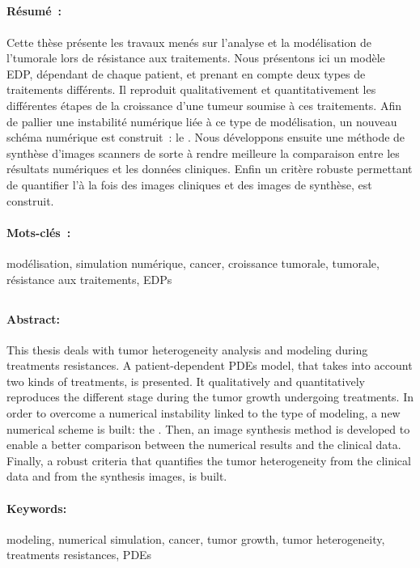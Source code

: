 \documentclass[main.tex]{subfiles}
\begin{document}
\subsection*{\titrefr}
\vfill
\paragraph{Résumé~:} Cette thèse présente les travaux menés sur l'analyse et la modélisation de l'\hetero tumorale lors de résistance aux traitements. 
Nous présentons ici un modèle EDP, dépendant de chaque patient, et prenant en compte deux types de traitements différents. Il reproduit qualitativement et quantitativement les différentes étapes de la croissance d'une tumeur soumise à ces traitements. Afin de pallier une instabilité numérique liée à ce type de modélisation, un nouveau schéma numérique est construit~: le \twinweno. 
Nous développons ensuite une méthode de synthèse d'images scanners de sorte à rendre meilleure la comparaison entre les résultats numériques et les données cliniques.  
Enfin un critère robuste permettant de quantifier l'\hetero à la fois des images cliniques et des images de synthèse, est construit. 

\paragraph{Mots-clés~:} modélisation, simulation numérique, cancer, croissance tumorale, \hetero tumorale, résistance aux traitements, EDPs

\vfill
\myhrule
\vfill

\subsection*{\titreen}
\vfill
\paragraph{Abstract:} This thesis deals with tumor heterogeneity analysis and modeling during treatments resistances. 
A patient-dependent PDEs model, that takes into account two kinds of treatments, is presented. It qualitatively and quantitatively reproduces the different stage during the tumor growth undergoing treatments. In order to overcome a numerical instability linked to the type of modeling, a new numerical scheme is built: the \twinweno. 
Then, an image synthesis method is developed to enable a better comparison between the numerical results and the clinical data. 
Finally, a robust criteria that quantifies the tumor heterogeneity from the clinical data and from the synthesis images, is built. 

\paragraph{Keywords:} modeling, numerical simulation, cancer, tumor growth, tumor heterogeneity, treatments resistances, PDEs
\end{document}
